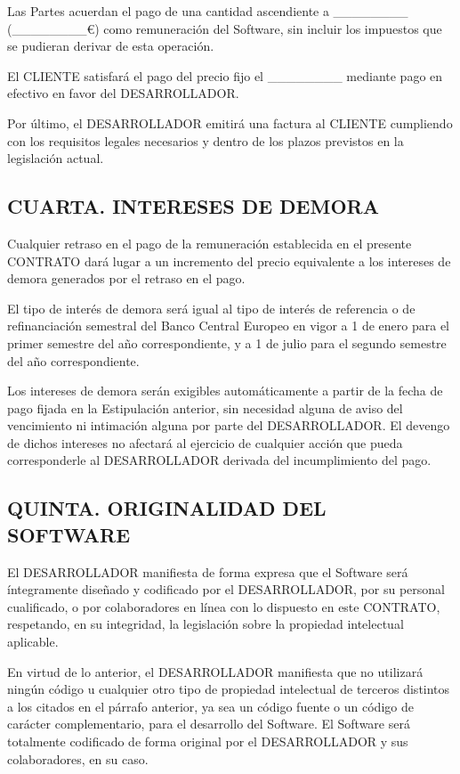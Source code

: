 \documentclass[a4paper,11pt]{report}
\begin{document}
	Las Partes acuerdan el pago de una cantidad ascendiente a \_\_\_\_\_\_\_\_
	(\_\_\_\_\_\_\_\_€) como remuneración del Software, sin incluir los impuestos
	que se pudieran derivar de esta operación.

	El CLIENTE satisfará el pago del precio fijo el \_\_\_\_\_\_\_\_ mediante pago
	en efectivo en favor del DESARROLLADOR.

	Por último, el DESARROLLADOR emitirá una factura al CLIENTE cumpliendo
	con los requisitos legales necesarios y dentro de los plazos previstos
	en la legislación actual.

	\subsection*{CUARTA. INTERESES DE DEMORA}

	Cualquier	retraso en el pago de la remuneración establecida en el presente
	CONTRATO dará lugar a un incremento del precio equivalente a los
	intereses de demora generados por el retraso en el pago.

	El tipo de interés de demora será igual al tipo de interés de referencia
	o de refinanciación semestral del Banco Central Europeo en vigor a 1 de
	enero para el primer semestre del año correspondiente, y a 1 de julio
	para el segundo semestre del año correspondiente.

	Los intereses de demora serán exigibles automáticamente a partir de la
	fecha de pago fijada en la Estipulación anterior, sin necesidad alguna
	de aviso del vencimiento ni intimación alguna por parte del
	DESARROLLADOR. El devengo de dichos intereses no afectará al ejercicio
	de cualquier acción que pueda corresponderle al DESARROLLADOR derivada
	del incumplimiento del pago.

	\subsection*{QUINTA. ORIGINALIDAD DEL SOFTWARE}

	El DESARROLLADOR manifiesta de forma expresa que el Software será
	íntegramente diseñado y codificado por el DESARROLLADOR, por su personal
	cualificado, o por colaboradores en línea con lo dispuesto en este
	CONTRATO, respetando, en su integridad, la legislación sobre la
	propiedad intelectual aplicable.

	En virtud de lo anterior, el DESARROLLADOR manifiesta que no utilizará
	ningún código u cualquier otro tipo de propiedad intelectual de terceros
	distintos a los citados en el párrafo anterior, ya sea un código fuente
	o un código de carácter complementario, para el desarrollo del Software.
	El Software será totalmente codificado de forma original por el
	DESARROLLADOR y sus colaboradores, en su caso.
\end{document}
